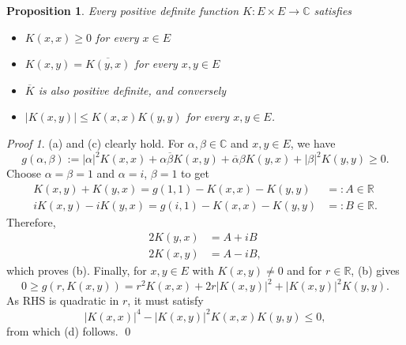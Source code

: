 \documentclass[a4paper,12pt]{article}
\newtheorem{prp}[thm]{Proposition}
\theoremstyle{remark}
\newtheorem*{prf}{Proof}
\theoremstyle{definition}
\theoremstyle{definition}
\theoremstyle{definition}
\newcommand{\abs}[1]{\left| #1 \right|}
\begin{document}
\begin{prp}
	Every positive definite function \( K:E \times E \to \mathbb{C} \) satisfies
	\begin{itemize}
		\item[(a)] \( K(x,x) \ge 0 \) for every \( x \in E \)
		\item[(b)] \( K(x,y)=\overline{K(y,x)} \) for every \( x,y \in E \)
		\item[(c)] \( \overline{K} \) is also positive definite, and conversely
		\item[(d)] \( \abs{K(x,y)} \le K(x,x)K(y,y) \) for every \( x,y \in E \).
	\end{itemize}
\end{prp}
\begin{prf}
	(a) and (c) clearly hold. For \( \alpha, \beta \in \mathbb{C} \) and \( x,y \in E \), we have
	\begin{equation*}
		g(\alpha,\beta) := \abs{\alpha}^2 K(x,x) + \alpha \overline{\beta}K(x,y) + \overline{\alpha}\beta K(y,x) + \abs{\beta}^2 K(y,y) \ge 0.
	\end{equation*}
	Choose \( \alpha=\beta=1 \) and \( \alpha = i \), \( \beta=1 \) to get
	\begin{equation*}
		\begin{aligned}
			K(x,y) + K(y,x) = g(1,1) - K(x,x) - K(y,y)     & =: A \in \mathbb{R}  \\
			i K(x,y) - i K(y,x) = g(i,1) - K(x,x) - K(y,y) & =: B \in \mathbb{R}.
		\end{aligned}
	\end{equation*}
	Therefore,
	\begin{equation*}
		\begin{aligned}
			2 K(y,x) & = A + iB  \\
			2 K(x,y) & = A - iB,
		\end{aligned}
	\end{equation*}
	which proves (b). Finally, for \( x,y \in E \) with \( K(x,y) \neq 0 \) and for \( r \in \mathbb{R} \), (b) gives
	\begin{equation*}
		0 \ge g(r,K(x,y)) = r ^2 K(x,x) + 2r \abs{K(x,y)}^2 + \abs{K(x,y)}^2K(y,y).
	\end{equation*}
	As RHS is quadratic in \( r \), it must satisfy
	\begin{equation*}
		\abs{K(x,x)}^4 - \abs{K(x,y)}^2K(x,x)K(y,y) \le 0,
	\end{equation*}
	from which (d) follows.
	\qed\end{prf}
\end{document}
